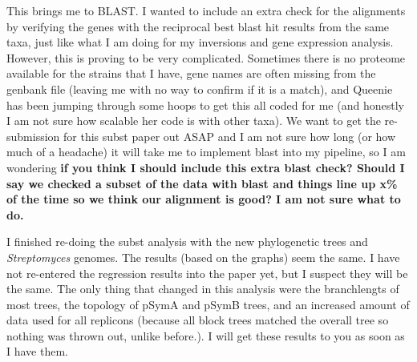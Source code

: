 \documentclass[12pt]{article}
\newcommand{\smel}{\textit{S.\,meliloti}\xspace}
\newcommand{\strep}{\textit{Streptomyces}\xspace}
\newcommand{\pa}{pSymA\xspace}
\newcommand{\pb}{pSymB\xspace}
\begin{document}
This brings me to BLAST. I wanted to include an extra check for the alignments by verifying the genes with the reciprocal best blast hit results from the same taxa, just like what I am doing for my inversions and gene expression analysis.
However, this is proving to be very complicated.
Sometimes there is no proteome available for the strains that I have, gene names are often missing from the genbank file (leaving me with no way to confirm if it is a match), and Queenie has been jumping through some hoops to get this all coded for me (and honestly I am not sure how scalable her code is with other taxa).
We want to get the re-submission for this subst paper out ASAP and I am not sure how long (or how much of a headache) it will take me to implement blast into my pipeline, so I am wondering \textbf{if you think I should include this extra blast check? Should I say we checked a subset of the data with blast and things line up x\% of the time so we think our alignment is good? I am not sure what to do.}






I finished re-doing the subst analysis with the new phylogenetic trees and \strep genomes.
The results (based on the graphs) seem the same. I have not re-entered the regression results into the paper yet, but I suspect they will be the same.
The only thing that changed in this analysis were the branchlengts of most trees, the topology of \pa and \pb trees, and an increased amount of data used for all replicons (because all block trees matched the overall tree so nothing was thrown out, unlike before.).
I will get these results to you as soon as I have them.





\end{document}
